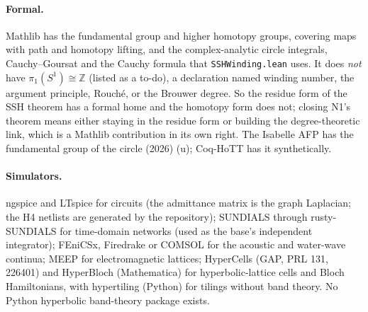 \documentclass[11pt,a4paper]{article}
\begin{document}
\paragraph{Formal.} Mathlib has the fundamental group and higher homotopy groups, covering maps with path and homotopy lifting, and the complex-analytic circle integrals, Cauchy--Goursat and the Cauchy formula that \texttt{SSHWinding.lean} uses. It does \emph{not} have $\pi_1(S^1)\cong\mathbb Z$ (listed as a to-do), a declaration named winding number, the argument principle, Rouch\'e, or the Brouwer degree. So the residue form of the SSH theorem has a formal home and the homotopy form does not; closing N1's theorem means either staying in the residue form or building the degree-theoretic link, which is a Mathlib contribution in its own right. The Isabelle AFP has the fundamental group of the circle (2026) (u); Coq-HoTT has it synthetically.
\paragraph{Simulators.} ngspice and LTspice for circuits (the admittance matrix is the graph Laplacian; the H4 netlists are generated by the repository); SUNDIALS through rusty-SUNDIALS for time-domain networks (used as the base's independent integrator); FEniCSx, Firedrake or COMSOL for the acoustic and water-wave continua; MEEP for electromagnetic lattices; HyperCells (GAP, PRL 131, 226401) and HyperBloch (Mathematica) for hyperbolic-lattice cells and Bloch Hamiltonians, with hypertiling (Python) for tilings without band theory. No Python hyperbolic band-theory package exists.
\end{document}
